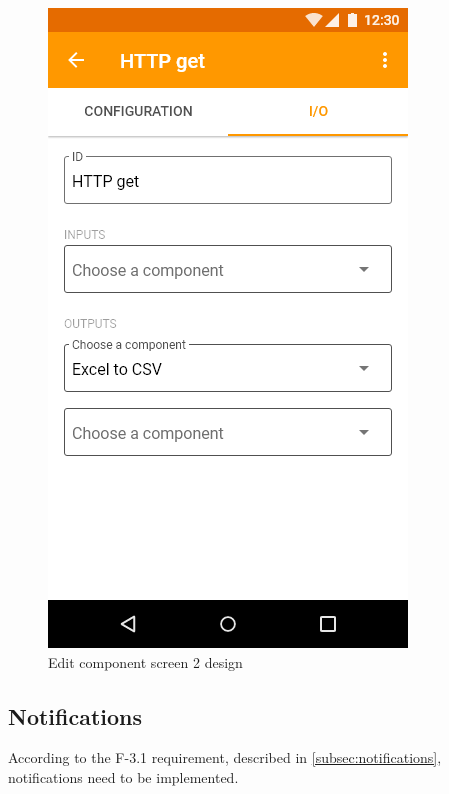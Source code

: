 \begin{figure}
\begin{minipage}[b]{0.32\textwidth}
    	\includegraphics[width=\textwidth]{pics/xd/Edit component - io.png}
    	\caption[Edit component screen 2]{Edit component screen 2 design}\label{fig:xdEditComponent2}
    \end{minipage}
\end{figure}

\subsection{Notifications}
According to the F-3.1 requirement, described in \autoref{subsec:notifications}, notifications need to be implemented.

